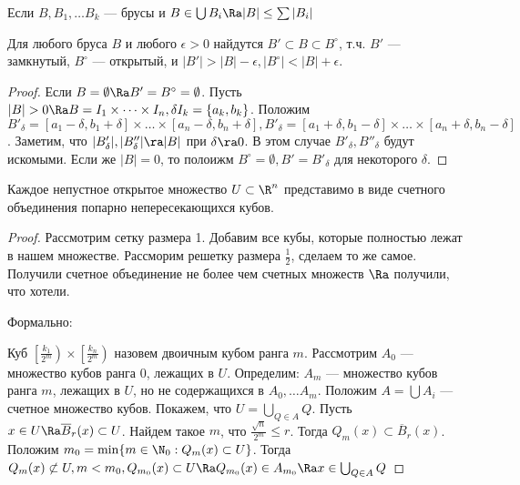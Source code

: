 
\begin{proposition}
    Если \(B, B_1, \dots B_k\) --- брусы и \(B \in \bigcup B_i \Ra |B| \le \sum|B_i|\)
\end{proposition}

\begin{proposition}
    Для любого бруса \(B\) и любого \(\epsilon > 0\) найдутся \(B' \subset B \subset B^\circ\), т.ч. 
    \(B'\) --- замкнутый, \(B^\circ\) --- открытый, и \(|B'| > |B| - \epsilon, |B^\circ| < |B| + \epsilon\).
\end{proposition}
\begin{proof}
    Если \(B = \emptyset \Ra B' = B^\circ = \emptyset\). Пусть \(|B| > 0 \Ra B = I_1\times \dots \times I_n, \delta I_k = \{a_k, b_k\}\). Положим \(B'_\delta = [a_1 - \delta, b_1 + \delta] \times \dots \times [a_n - \delta, b_n + \delta], B'_\delta = [a_1 + \delta, b_1 - \delta] \times \dots \times [a_n + \delta, b_n - \delta]\). Заметим, что \(|B'_\delta|, |B''_\delta| \ra |B|\) при \(\delta \ra 0\). В этом случае \(B'_\delta, B''_\delta\) будут искомыми. Если же \(|B| = 0\), то полоижм \(B^\circ = \emptyset, B' = B'_\delta\) для некоторого \(\delta\).
\end{proof}

\begin{lemma}
    Каждое непустное открытое множество \(U \subset \R^n\) представимо в виде счетного объединения попарно непересекающихся кубов.
\end{lemma}
\begin{proof}
    Рассмотрим сетку размера 1. Добавим все кубы, которые полностью лежат в нашем множестве. Рассморим решетку размера \(\frac{1}{2}\), сделаем то же самое. Получили счетное объединение не более чем счетных множеств  \(\Ra\) получили, что хотели.

    Формально:

    Куб \(\left[\frac{k_1}{2^m}\right) \times \left[\frac{k_n}{2^m}\right)\) назовем двоичным кубом ранга \(m\). Рассмотрим \(A_0\) --- множество кубов ранга \(0\), лежащих в \(U\). Определим: \(A_m\) --- множество кубов ранга \(m\), лежащих в \(U\), но не содержащихся в \(A_0, \dots A_m\). Положим \(A = \bigcup A_i\) --- счетное множество кубов. Покажем, что \(U = \bigcup_{Q \in A} Q\). Пусть \(x \in U \Ra \overline{B}_r(x) \subset U\). Найдем такое \(m\), что \(\frac{\sqrt{n}}{2^m} \le r\). Тогда \(Q_m(x) \subset \overline{B}_r(x)\). Положим \(m_0 = \min\{m \in \N_0: Q_m(x) \subset U\}\). Тогда \(Q_m(x) \not\subset U, m < m_0, Q_{m_0}(x) \subset U \Ra Q_{m_0}(x) \in A_{m_0} \Ra x \in \bigcup_{Q \in A} Q\)
\end{proof}

